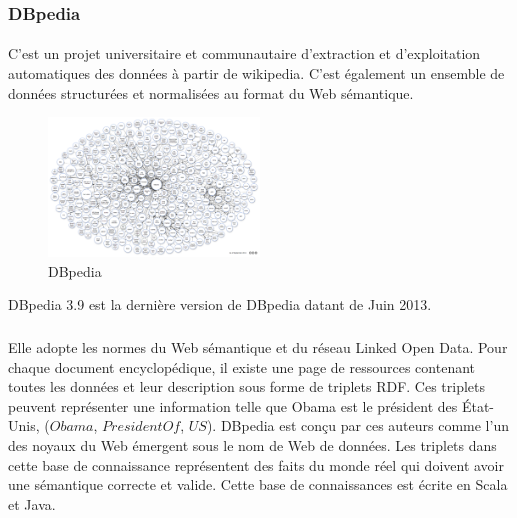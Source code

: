 \documentclass[12pt,a4]{report}
\begin{document}
\subsubsection{DBpedia}
\paragraph{}
C'est un projet universitaire et communautaire d’extraction et d’exploitation automatiques des données à partir de wikipedia. C’est également un ensemble de données structurées et normalisées au format du Web sémantique.
\begin{figure}
\vspace{-10pt}
\begin{center}
\includegraphics[width=0.50\textwidth]{dbpedia.png}
\end{center}
\vspace{-15pt}
\caption{DBpedia}
\vspace{-10pt}
\end{figure}
DBpedia 3.9 est la dernière version de DBpedia datant de Juin 2013.
\subparagraph{}
Elle adopte les normes du Web sémantique et du réseau Linked Open Data. Pour chaque document encyclopédique, il existe une page de ressources contenant toutes les données et leur description sous forme de triplets RDF. Ces triplets peuvent représenter une information telle que Obama est le président des État-Unis, ($Obama$, $PresidentOf$, $US$).
DBpedia est conçu par ces auteurs comme l'un des noyaux du Web émergent sous le nom de Web de données. Les triplets dans cette base de connaissance représentent des faits du monde réel qui doivent avoir une sémantique correcte et valide. Cette base de connaissances est écrite en Scala et Java.

\newpage
\end{document}
